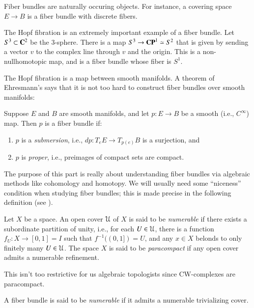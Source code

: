 Fiber bundles are naturally occuring objects.
For instance, a covering space $E\to B$ is a fiber bundle with discrete fibers. 
\begin{example}
    The Hopf fibration is an extremely important example of a fiber bundle.
    Let $S^3\subset \mathbf C^2$ be the $3$-sphere.
    There is a map $S^3\to \mathbf{CP}^1 \simeq S^2$ that is given by sending a vector $v$ to the
    complex line through $v$ and the origin.
    This is a non-nullhomotopic map, and is a fiber bundle whose fiber is $S^1$.
\end{example}
The Hopf fibration is a map between smooth manifolds.
A theorem of Ehresmann's says that it is not too hard to construct fiber bundles over smooth manifolds:
\begin{theorem}[Ehresmann]
    Suppose $E$ and $B$ are smooth manifolds, and let $p:E\to B$ be a smooth (i.e., $C^\infty$) map.
    Then $p$ is a fiber bundle if:
    \begin{enumerate}
	\item $p$ is a \emph{submersion}, i.e., $dp:T_e E\to T_{p(e)} B$ is a surjection, and
	\item $p$ is \emph{proper}, i.e., preimages of compact sets are compact.
    \end{enumerate}
\end{theorem}
The purpose of this part is really about understanding fiber bundles via algebraic
methods like cohomology and homotopy.
We will usually need some ``niceness'' condition when studying fiber bundles;
this is made precise in the following definition (see \cite{MayConcise}).
\begin{definition}
    Let $X$ be a space.
    An open cover $\mathcal U$ of $X$ is said to be \emph{numerable}
    if there exists a subordinate partition of unity, i.e.,
    for each $U\in\mathcal U$, there is a function $f_U:X\to [0,1]=I$
    such that $f^{-1}((0,1]) = U$,
    and any $x\in X$ belonds to only finitely many $U\in\mathcal U$.
    The space $X$ is said to be \emph{paracompact} if any open cover admits a numerable refinement.
\end{definition}
This isn't too restrictive for us algebraic topologists since CW-complexes are paracompact.
\begin{definition}
    A fiber bundle is said to be \emph{numerable} if it admits a numerable trivializing cover.
\end{definition}

